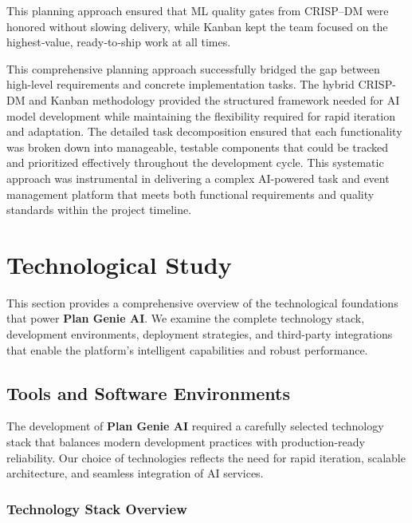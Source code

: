 \documentclass[12pt,a4paper]{article}
\begin{document}
This planning approach ensured that ML quality gates from CRISP–DM were honored without slowing delivery, while Kanban kept the team focused on the highest‑value, ready‑to‑ship work at all times.

This comprehensive planning approach successfully bridged the gap between high-level requirements and concrete implementation tasks. The hybrid CRISP-DM and Kanban methodology provided the structured framework needed for AI model development while maintaining the flexibility required for rapid iteration and adaptation. The detailed task decomposition ensured that each functionality was broken down into manageable, testable components that could be tracked and prioritized effectively throughout the development cycle. This systematic approach was instrumental in delivering a complex AI-powered task and event management platform that meets both functional requirements and quality standards within the project timeline.


\section{Technological Study}

This section provides a comprehensive overview of the technological foundations that power \textbf{Plan Genie AI}. We examine the complete technology stack, development environments, deployment strategies, and third-party integrations that enable the platform's intelligent capabilities and robust performance.

\subsection{Tools and Software Environments}

The development of \textbf{Plan Genie AI} required a carefully selected technology stack that balances modern development practices with production-ready reliability. Our choice of technologies reflects the need for rapid iteration, scalable architecture, and seamless integration of AI services.

\subsubsection{Technology Stack Overview}
\end{document}
